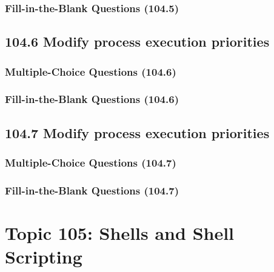 \documentclass[a4paper]{report}
\begin{document}
\subsubsection*{Fill-in-the-Blank Questions (104.5)}

\subsection*{104.6 Modify process execution priorities}
\subsubsection*{Multiple-Choice Questions (104.6)}

\subsubsection*{Fill-in-the-Blank Questions (104.6)}

\subsection*{104.7 Modify process execution priorities}
\subsubsection*{Multiple-Choice Questions (104.7)}

\subsubsection*{Fill-in-the-Blank Questions (104.7)}


\section*{Topic 105: Shells and Shell Scripting}

\end{document}

